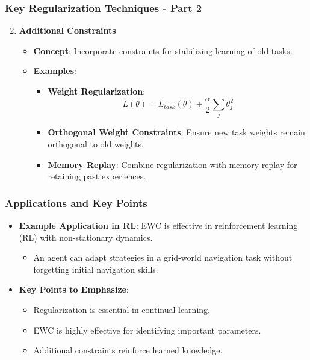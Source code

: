 \documentclass[aspectratio=169]{beamer}
\begin{document}
\begin{frame}[fragile]
    \frametitle{Key Regularization Techniques - Part 2}
    \begin{enumerate}
        \setcounter{enumi}{1} %
        \item \textbf{Additional Constraints}
        \begin{itemize}
            \item \textbf{Concept}: Incorporate constraints for stabilizing learning of old tasks.
            \item \textbf{Examples}:
            \begin{itemize}
                \item \textbf{Weight Regularization}:
                \begin{equation}
                L(\theta) = L_{task}(\theta) + \frac{\alpha}{2} \sum_{j} \theta_j^2
                \end{equation}
                \item \textbf{Orthogonal Weight Constraints}: Ensure new task weights remain orthogonal to old weights.
                \item \textbf{Memory Replay}: Combine regularization with memory replay for retaining past experiences.
            \end{itemize}
        \end{itemize}
    \end{enumerate}
\end{frame}

\begin{frame}[fragile]
    \frametitle{Applications and Key Points}
    \begin{itemize}
        \item \textbf{Example Application in RL}:
        EWC is effective in reinforcement learning (RL) with non-stationary dynamics.
        \begin{itemize}
            \item An agent can adapt strategies in a grid-world navigation task without forgetting initial navigation skills.
        \end{itemize}
        \item \textbf{Key Points to Emphasize}:
        \begin{itemize}
            \item Regularization is essential in continual learning.
            \item EWC is highly effective for identifying important parameters.
            \item Additional constraints reinforce learned knowledge.
        \end{itemize}
    \end{itemize}
\end{frame}
\end{document}
